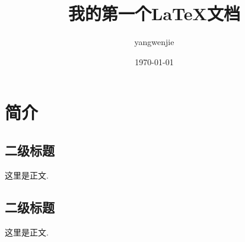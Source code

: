 \documentclass[12pt, a4paper]{ctexart}
\title{我的第一个\LaTeX 文档}
\author{yangwenjie}
\date{\today}
\begin{document}
\maketitle

\section{简介}

\subsection{二级标题}

这里是正文. 

\subsection{二级标题}

这里是正文.
\end{document}
